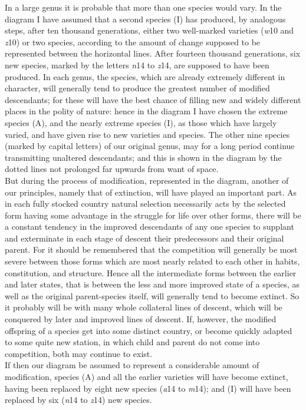 \indent In a large genus it is probable that more than one species would vary. In the diagram I have assumed that a second species (I) has produced, by analogous steps, after ten thousand generations, either two well-marked varieties (\emph{w}10 and \emph{z}10) or two species, according to the amount of change supposed to be represented between the horizontal lines. After fourteen thousand generations, six new species, marked by the letters \emph{n}14 to \emph{z}14, are supposed to have been produced. In each genus, the species, which are already extremely different in character, will generally tend to produce the greatest number of modified descendants; for these will have the best chance of filling new and widely different places in the polity of nature: hence in the diagram I have chosen the extreme species (A), and the nearly extreme species (I), as those which have largely varied, and have given rise to new varieties and species.  The other nine species (marked by capital letters) of our original genus, may for a long period continue transmitting unaltered descendants; and this is shown in the diagram by the dotted lines not prolonged far upwards from want of space. \\
\indent But during the process of modification, represented in the diagram, another of our principles, namely that of extinction, will have played an important part. As in each fully stocked country natural selection necessarily acts by the selected form having some advantage in the struggle for life over other forms, there will be a constant tendency in the improved descendants of any one species to supplant and exterminate in each stage of descent their predecessors and their original parent. For it should be remembered that the competition will generally be most severe between those forms which are most nearly related to each other in habits, constitution, and structure. Hence all the intermediate forms between the earlier and later states, that is between the less and more improved state of a species, as well as the original parent-species itself, will generally tend to become extinct. So it probably will be with many whole collateral lines of descent, which will be conquered by later and improved lines of descent. If, however, the modified offspring of a species get into some distinct country, or become quickly adapted to some quite new station, in which child and parent do not come into competition, both may continue to exist. \\
\indent If then our diagram be assumed to represent a considerable amount of modification, species (A) and all the earlier varieties will have become extinct, having been replaced by eight new species (\emph{a}14 to \emph{m}14); and (I) will have been replaced by six (\emph{n}14 to \emph{z}14) new species. \\
